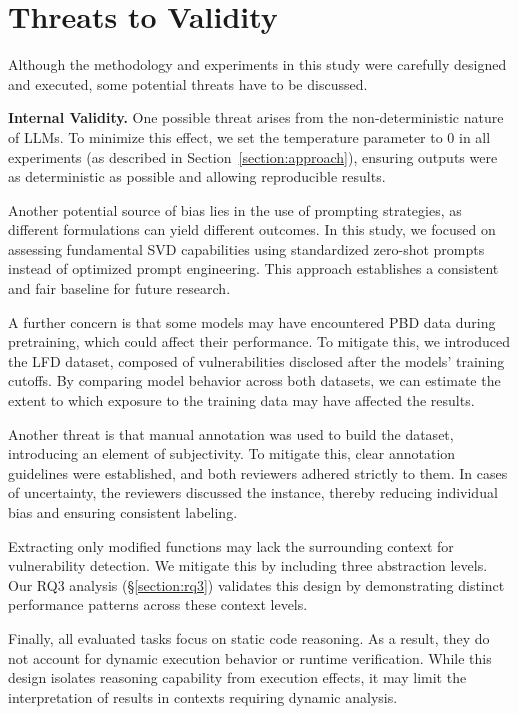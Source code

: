 \documentclass[lettersize,journal]{IEEEtran}
\begin{document}
\section{Threats to Validity}
\label{section:threatstovalidity}

Although the methodology and experiments in this study were carefully designed and executed, some potential threats have to be discussed.

\textbf{Internal Validity.}
One possible threat arises from the non-deterministic nature of \glspl{LLM}. To minimize this effect, we set the temperature parameter to 0 in all experiments (as described in Section~\ref{section:approach}), ensuring outputs were as deterministic as possible and allowing reproducible results.

Another potential source of bias lies in the use of prompting strategies, as different formulations can yield different outcomes. In this study, we focused on assessing fundamental \gls{SVD} capabilities using standardized zero-shot prompts instead of optimized prompt engineering. This approach establishes a consistent and fair baseline for future research.

A further concern is that some models may have encountered PBD data during pretraining, which could affect their performance. To mitigate this, we introduced the LFD dataset, composed of vulnerabilities disclosed after the models’ training cutoffs. By comparing model behavior across both datasets, we can estimate the extent to which exposure to the training data may have affected the results.

Another threat is that manual annotation was used to build the dataset, introducing an element of subjectivity. To mitigate this, clear annotation guidelines were established, and both reviewers adhered strictly to them. In cases of uncertainty, the reviewers discussed the instance, thereby reducing individual bias and ensuring consistent labeling.

Extracting only modified functions may lack the surrounding context for vulnerability detection. We mitigate this by including three abstraction levels. Our RQ3 analysis (\S\ref{section:rq3}) validates this design by demonstrating distinct performance patterns across these context levels.

Finally, all evaluated tasks focus on static code reasoning. As a result, they do not account for dynamic execution behavior or runtime verification. While this design isolates reasoning capability from execution effects, it may limit the interpretation of results in contexts requiring dynamic analysis.
\end{document}

